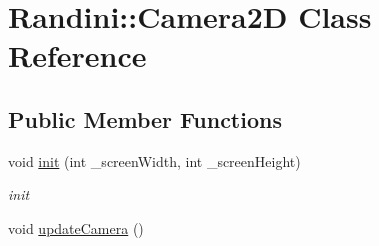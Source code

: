 \hypertarget{classRandini_1_1Camera2D}{
\section{Randini::Camera2D Class Reference}
\label{classRandini_1_1Camera2D}
}
\subsection*{Public Member Functions}
\begin{DoxyCompactItemize}
\item 
void \hyperlink{classRandini_1_1Camera2D_ab658d7f26ed3fec10ac4e16882ea85e0}{init} (int \_\-screenWidth, int \_\-screenHeight)
\begin{DoxyCompactList}\small\item\em init \item\end{DoxyCompactList}\item 
\hypertarget{classRandini_1_1Camera2D_a6624d7fd91cdf68e305568aa2ace5539}{
void \hyperlink{classRandini_1_1Camera2D_a6624d7fd91cdf68e305568aa2ace5539}{updateCamera} ()}
\label{classRandini_1_1Camera2D_a6624d7fd91cdf68e305568aa2ace5539}


\end{DoxyCompactItemize}
